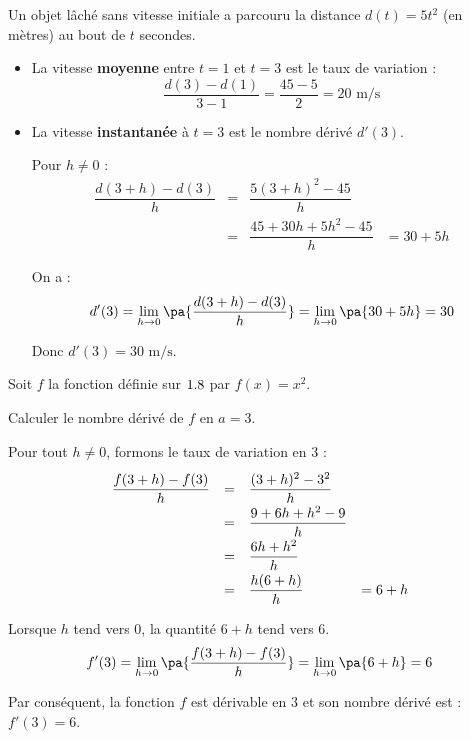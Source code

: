 \begin{ex}
	Un objet lâché sans vitesse initiale a parcouru la distance $d(t) = 5t^2$ (en mètres) au bout de $t$ secondes.

	\begin{itemize}
		\item La vitesse \textbf{moyenne} entre $t = 1$ et $t = 3$ est le taux de variation :
		      \[
			      \dfrac{d(3) - d(1)}{3 - 1} = \dfrac{45 - 5}{2} = 20 \text{ m/s}
		      \]

		\item La vitesse \textbf{instantanée} à $t = 3$ est le nombre dérivé $d'(3)$.

		      Pour $h \neq 0$ :
		      \[
			      \begin{array}{rccl}
				      \dfrac{d(3 + h) - d(3)}{h} & = & \dfrac{5(3 + h)^2 - 45}{h}      &           \\
				                                 & = & \dfrac{45 + 30h + 5h^2 - 45}{h} & = 30 + 5h
			      \end{array}
		      \]

		      On a :
		      \[
			      d'(3) = \lim\limits_{h\to 0}\pa{\dfrac{d(3 + h) - d(3)}{h}} = \lim\limits_{h\to 0}\pa{30+5h} = 30
		      \]

		      Donc $d'(3) = 30 \text{ m/s}$.
	\end{itemize}
\end{ex}

\begin{methode}
	Soit $f$ la fonction définie sur $1.8$ par $f(x) = x^2$.

	Calculer le nombre dérivé de $f$ en $a = 3$.

	\begin{correction}
		Pour tout $h \neq 0$, formons le taux de variation en $3$ :
		\[
			\def\arraystretch{2}
			\begin{array}{rcll}
				\dfrac{f(3 + h) - f(3)}{h} & = & \dfrac{(3 + h)^2 - 3^2}{h}  &         \\
				                           & = & \dfrac{9 + 6h + h^2 - 9}{h} &         \\
				                           & = & \dfrac{6h + h^2}{h}         &         \\
				                           & = & \dfrac{h(6 + h)}{h}         & = 6 + h
			\end{array}
		\]

		Lorsque $h$ tend vers $0$, la quantité $6 + h$ tend vers $6$.
		\[
			f'(3)=\lim\limits_{h\to 0}\pa{\dfrac{f(3+h)-f(3)}{h}}=\lim\limits_{h\to 0}\pa{6+h}=6
		\]

		Par conséquent, la fonction $f$ est dérivable en $3$ et son nombre dérivé est : $f'(3) = 6$.

	\end{correction}
\end{methode}

